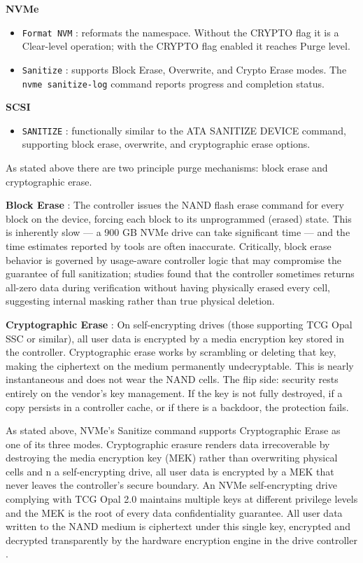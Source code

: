 \textbf{NVMe}
\begin{itemize}
    \item \texttt{Format NVM} : reformats the namespace. Without the CRYPTO flag it is a Clear-level operation; with the CRYPTO flag enabled it reaches Purge level.
    \item \texttt{Sanitize} : supports Block Erase, Overwrite, and Crypto Erase modes. The \texttt{nvme sanitize-log} command reports progress and completion status.
\end{itemize}

\textbf{SCSI}
\begin{itemize}
    \item \texttt{SANITIZE} : functionally similar to the ATA SANITIZE DEVICE command, supporting block erase, overwrite, and cryptographic erase options.
\end{itemize}

As stated above there are two principle purge mechanisms: block erase and cryptographic erase. 

\textbf{Block Erase} : The controller issues the NAND flash erase command for every block on the 
device, forcing each block to its unprogrammed (erased) state. This is inherently slow — a 900 GB 
NVMe drive can take significant time — and the time estimates reported by tools are often 
inaccurate. Critically, block erase behavior is governed by usage-aware controller logic that may 
compromise the guarantee of full sanitization; studies found that the controller sometimes returns 
all-zero data during verification without having physically erased every cell, suggesting internal 
masking rather than true physical deletion. \cite{aronsson2025secure}

\textbf{Cryptographic Erase} : On self-encrypting drives (those supporting TCG Opal SSC or similar), 
all user data is encrypted by a media encryption key stored in the controller. Cryptographic erase 
works by scrambling or deleting that key, making the ciphertext on the medium permanently 
undecryptable. This is nearly instantaneous and does not wear the NAND cells. The flip side: 
security rests entirely on the vendor's key management. If the key is not fully destroyed, if a 
copy persists in a controller cache, or if there is a backdoor, the protection fails. \cite{aronsson2025secure}

As stated above, NVMe's Sanitize command supports Cryptographic Erase as one of its three modes. Cryptographic 
erasure renders data irrecoverable by destroying the media encryption key (MEK) rather than overwriting 
physical cells and n a self-encrypting drive, all user data is encrypted by a MEK that never leaves the 
controller's secure boundary. An NVMe self-encrypting drive complying with TCG Opal 2.0 maintains 
multiple keys at different privilege levels and the MEK is the root of every data confidentiality guarantee. 
All user data written to the NAND medium is ciphertext under this single key, encrypted and decrypted 
transparently by the hardware encryption engine in the drive controller \cite{aronsson2025secure}.


